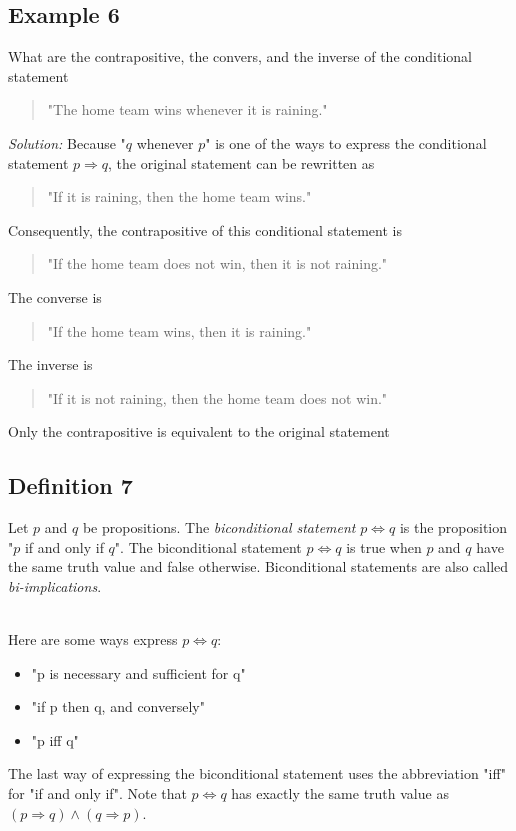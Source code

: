 \documentclass{article}
\begin{document}
\subsection*{Example 6}
What are the contrapositive, the convers, and the inverse of the conditional statement
\begin{quote}
	"The home team wins whenever it is raining."
\end{quote}
\textit{Solution:} Because "$q$ whenever $p$" is one of the ways to express the conditional statement
$p \Rightarrow q$, the original statement can be rewritten as
\begin{quote}

	"If it is raining, then the home team wins."

\end{quote}
Consequently, the contrapositive of this conditional statement is
\begin{quote}
	"If the home team does not win, then it is not raining."
\end{quote}
The converse is
\begin{quote}
	"If the home team wins, then it is raining."
\end{quote}
The inverse is
\begin{quote}
	"If it is not raining, then the home team does not win."
\end{quote}
Only the contrapositive is equivalent to the original statement

\subsection[Biconditionals]{Definition 7}
Let $p$ and $q$ be propositions. The \textit{biconditional statement} $p \Leftrightarrow q$ is the
proposition "$p$ if and only if $q$". The biconditional statement $p \Leftrightarrow q$ is true when
$p$ and $q$ have the same truth value and false otherwise. Biconditional statements are also called
\textit{bi-implications}.

\noindent \\ Here are some ways express $p \Leftrightarrow q$:

\begin{itemize}
	\item "p is necessary and sufficient for q"
	\item "if p then q, and conversely"
	\item "p iff q"
\end{itemize}

\noindent The last way of expressing the biconditional statement uses the abbreviation "iff"
for "if and only if". Note that $p \Leftrightarrow q$ has exactly the same truth value as $(p \Rightarrow q) \wedge (q \Rightarrow p)$.
\end{document}
